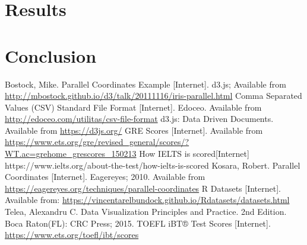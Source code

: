 \documentclass[]{article}
\begin{document}
\section{Results}

\section{Conclusion}

\begin{thebibliography}{11}
		Bostock, Mike. Parallel Coordinates Example [Internet]. d3.js; Available from \url{http://mbostock.github.io/d3/talk/20111116/iris-parallel.html}
		Comma Separated Values (CSV) Standard File Format [Internet]. Edoceo. Available from \url{http://edoceo.com/utilitas/csv-file-format}
		d3.js: Data Driven Documents. Available from \url{https://d3js.org/}
		GRE Scores [Internet]. Available from \url{https://www.ets.org/gre/revised_general/scores/?WT.ac=grehome_grescores_150213}
		How IELTS is scored[Internet] https://www.ielts.org/about-the-test/how-ielts-is-scored
		Kosara, Robert. Parallel Coordinates [Internet]. Eagereyes; 2010. Available from \url{https://eagereyes.org/techniques/parallel-coordinates}
		R Datasets [Internet]. Available from: \url{https://vincentarelbundock.github.io/Rdatasets/datasets.html}
		Telea, Alexandru C. Data Visualization Principles and Practice. 2nd Edition. Boca Raton(FL): CRC Press; 2015.
		TOEFL iBT® Test Scores [Internet]. \url{https://www.ets.org/toefl/ibt/scores}
\end{thebibliography}
\end{document}
